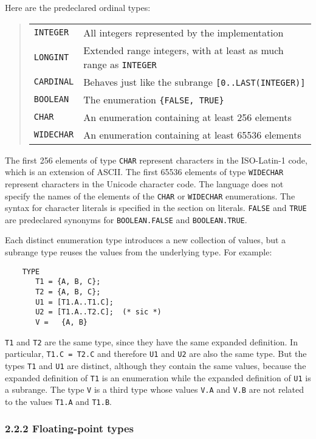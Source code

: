 \documentclass[10pt]{article}
\begin{document}
Here are the predeclared ordinal types:
\begin{quote}
  \begin{tabular}{ll}
    \verb|INTEGER|  & All integers represented by the implementation \\
    \verb|LONGINT|  & Extended range integers, with at least as much range as
                      \verb|INTEGER| \\
    \verb|CARDINAL| & Behaves just like the subrange \verb|[0..LAST(INTEGER)]|
    \\
    \verb|BOOLEAN|  & The enumeration \verb|{FALSE, TRUE}| \\
    \verb|CHAR|     & An enumeration containing at least 256 elements \\
    \verb|WIDECHAR| & An enumeration containing at least 65536 elements \\
  \end{tabular}
\end{quote}
The first 256 elements of type \verb|CHAR| represent characters in the
ISO-Latin-1 code, which is an extension of ASCII.  
The first 65536 elements of type \verb|WIDECHAR| represent characters in the
Unicode character code.  
The language does not specify the names of the elements of the \verb|CHAR| 
or \verb|WIDECHAR| enumerations.  The syntax
for character literals is specified in the section on literals.  \verb|FALSE|
and \verb|TRUE| are predeclared synonyms for \verb|BOOLEAN.FALSE| and
\verb|BOOLEAN.TRUE|.

Each distinct enumeration type introduces a new collection of values, but a
subrange type reuses the values from the underlying type.  For example:
\begin{verbatim}
    TYPE
       T1 = {A, B, C};
       T2 = {A, B, C};
       U1 = [T1.A..T1.C];
       U2 = [T1.A..T2.C];  (* sic *)
       V =   {A, B}
\end{verbatim}
\verb|T1| and \verb|T2| are the same type, since they have the same expanded
definition.  In particular, \verb|T1.C = T2.C| and therefore \verb|U1| and
\verb|U2| are also the same type.  But the types \verb|T1| and \verb|U1| are
distinct, although they contain the same values, because the expanded
definition of \verb|T1| is an enumeration while the expanded definition of
\verb|U1| is a subrange.  The type \verb|V| is a third type whose values
\verb|V.A| and \verb|V.B| are not related to the values \verb|T1.A| and
\verb|T1.B|.

\subsubsection*{2.2.2 Floating-point types}
\end{document}
